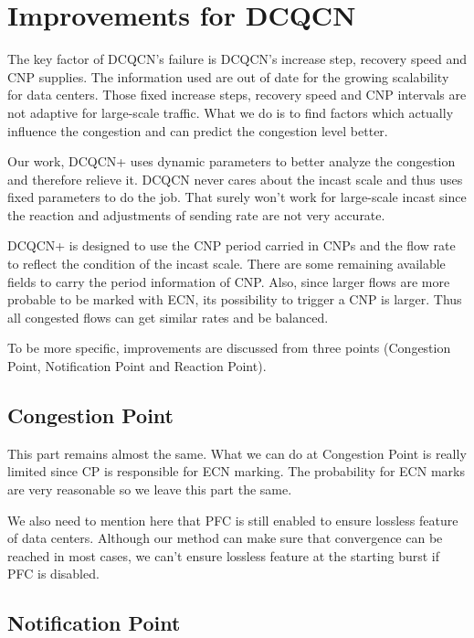 \documentclass[12pt,a4paper]{article}
\begin{document}
\newpage
\section{Improvements for DCQCN}

The key factor of DCQCN's failure is DCQCN's increase step, recovery speed and CNP supplies.
The information used are out of date for the growing scalability for data centers.
Those fixed increase steps, recovery speed and CNP intervals are not adaptive for large-scale traffic.
What we do is to find factors which actually influence the congestion and can predict the congestion level better.

Our work, DCQCN+ uses dynamic parameters to better analyze the congestion and therefore relieve it.
DCQCN never cares about the incast scale and thus uses fixed parameters to do the job.
That surely won't work for large-scale incast since the reaction and adjustments of sending rate are not very accurate.

DCQCN+ is designed to use the CNP period carried in CNPs and the flow rate to reflect the condition of the incast scale.
There are some remaining available fields to carry the period information of CNP.
Also, since larger flows are more probable to be marked with ECN, its possibility to trigger a CNP is larger.
Thus all congested flows can get similar rates and be balanced.

To be more specific, improvements are discussed from three points (Congestion Point, Notification Point and Reaction Point).

\subsection{Congestion Point}

This part remains almost the same.
What we can do at Congestion Point is really limited since CP is responsible for ECN marking.
The probability for ECN marks are very reasonable so we leave this part the same.

We also need to mention here that PFC is still enabled to ensure lossless feature of data centers.
Although our method can make sure that convergence can be reached in most cases, we can't ensure lossless feature at the starting burst
if PFC is disabled.

\subsection{Notification Point}
\end{document}
